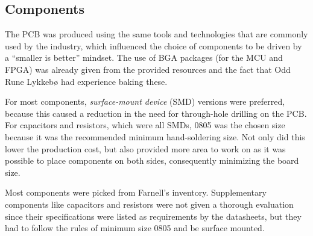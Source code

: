 
\subsection{Components}

The PCB was produced using the same tools and technologies that are commonly
used by the industry, which influenced the choice of components to be driven by
a ``smaller is better'' mindset. The use of BGA packages (for the MCU and FPGA)
was already given from the provided resources and the fact that Odd Rune Lykkebø
had experience baking these.

For most components, \emph{surface-mount device} (SMD) versions were
preferred, because this caused a reduction in the need for through-hole drilling
on the PCB. For capacitors and resistors, which were all SMDs, 0805 was the chosen size because it
was the recommended minimum hand-soldering size. Not only did this lower the
production cost, but also provided more area to work on as it was possible to
place components on both sides, consequently minimizing the board size.

Most components were picked from Farnell's inventory. Supplementary components
like capacitors and resistors were not given a thorough evaluation since their
specifications were listed as requirements by the datasheets, but they had to
follow the rules of minimum size 0805 and be surface mounted.







